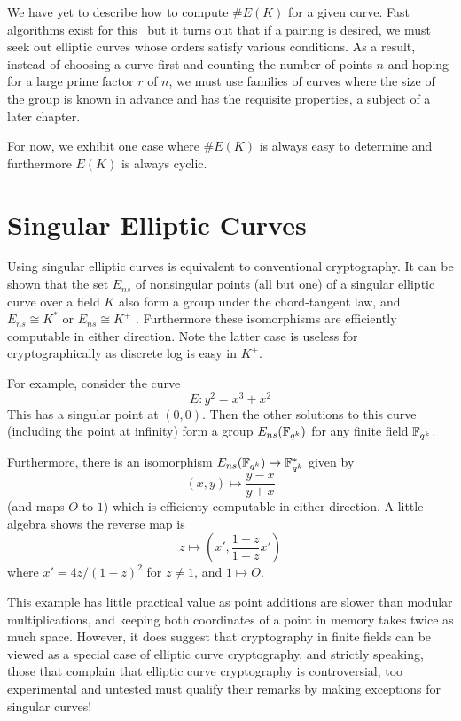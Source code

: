 We have yet to describe how to compute $\#E(K)$ for a given curve.
Fast algorithms exist for this~\cite{bss}
but it turns out that if a pairing is desired, we must seek out
elliptic curves whose orders satisfy various conditions.
As a result,
instead of choosing a curve first and counting the number of points $n$ and
hoping for a large prime factor $r$ of $n$,
we must use families of curves where the size of the group
is known in advance and has the requisite properties,
a subject of a later chapter.

For now, we exhibit one case where $\#E(K)$ is always easy to determine
and furthermore $E(K)$ is always cyclic.

\section {\label{sec:singular}Singular Elliptic Curves}

Using singular elliptic curves
is equivalent to conventional cryptography.
It can be shown that the set $E_{ns}$ of nonsingular points (all but
one) of a singular elliptic curve over a field $K$
also form a group under the chord-tangent law,
and $E_{ns} \cong K^*$ or $E_{ns} \cong K^+$ \cite[Proposition 2.5]{silverman}.
Furthermore these isomorphisms are efficiently computable in either
direction.
Note the latter case is useless for cryptographically
as discrete log is easy in $K^+$.

For example, consider the curve
\[ E : y^2 = x^3 + x^2 \]
This has a singular point at $(0,0)$. Then the other solutions to
this curve (including the point at infinity) form a group
$E_{ns}(\mathbb{F}_{q^k})$ for any finite field $\mathbb{F}_{q^k}$.

Furthermore, there is an isomorphism $E_{ns}(\mathbb{F}_{q^k}) \rightarrow \mathbb{F}_{q^k}^*$
given by
\[ (x,y) \mapsto \frac{y-x}{y+x} \]
(and maps $O$ to $1$)
which is efficienty computable in either direction.
A little algebra
shows the reverse map is
\[ z \mapsto \left( x', \frac{1+z}{1-z} x' \right) \]
where $x' = 4z/(1-z)^2$ for $z \ne 1$, and $1 \mapsto O$.

This example has little practical value as point additions are slower than
modular multiplications, and keeping both coordinates of a point in memory
takes twice as much space. However, it does suggest
that cryptography in finite fields can be viewed as a special
case of elliptic curve cryptography, and strictly speaking,
those that complain that elliptic curve cryptography is controversial,
too experimental and untested must qualify
their remarks by making exceptions for singular curves!

